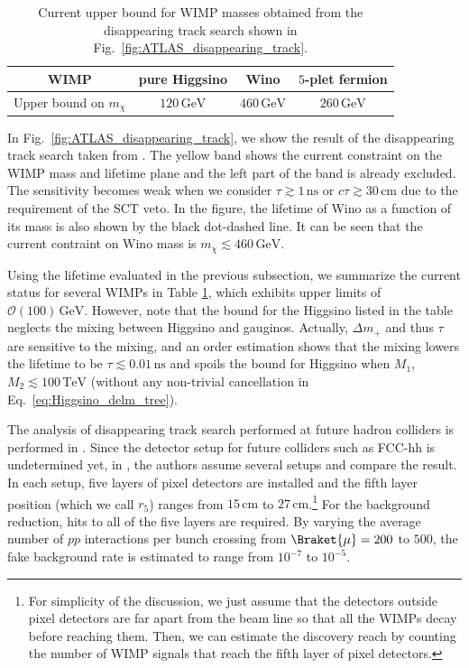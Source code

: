 \documentclass[12pt,twoside,book]{article}
\begin{document}
\begin{table}[t]
  \centering
  \begin{tabular}{c|ccc}
    WIMP & pure Higgsino & Wino & $5$-plet fermion \\ \hline
    Upper bound on $m_\chi$ & $120\, \mathrm{GeV}$ & $460\, \mathrm{GeV}$
    & $260\, \mathrm{GeV}$
  \end{tabular}
  \caption{
    Current upper bound for WIMP masses obtained from the disappearing track search shown in Fig.~\ref{fig:ATLAS_disappearing_track}.}
  \label{tab:disp_track_current}
\end{table}

In Fig.~\ref{fig:ATLAS_disappearing_track}, we show the result of the disappearing track search taken from \cite{Aaboud:2017mpt}.
The yellow band shows the current constraint on the WIMP mass and lifetime plane and the left part of the band is already excluded.
The sensitivity becomes weak when we consider $\tau \gtrsim 1\, \mathrm{ns}$ or $c \tau \gtrsim 30\, \mathrm{cm}$ due to the requirement of the SCT veto.
In the figure, the lifetime of Wino as a function of its mass is also shown by the black dot-dashed line.
It can be seen that the current contraint on Wino mass is $m_\chi \lesssim 460\,\mathrm{GeV}$.

Using the lifetime evaluated in the previous subsection, we summarize the current status for several WIMPs in Table \ref{tab:disp_track_current}, which exhibits upper limits of $\mathcal{O} (100)\,\mathrm{GeV}$.
However, note that the bound for the Higgsino listed in the table neglects the mixing between Higgsino and gauginos.
Actually, $\Delta m_{+}$ and thus $\tau$ are sensitive to the mixing, and an order estimation shows that the mixing lowers the lifetime to be $\tau \lesssim 0.01\,\mathrm{ns}$ and spoils the bound for Higgsino when $M_1$, $M_2 \lesssim 100\,\mathrm{TeV}$ (without any non-trivial cancellation in Eq.~\eqref{eq:Higgsino_delm_tree}).

The analysis of disappearing track search performed at future hadron colliders is performed in \cite{Han:2018wus, Saito:2019rtg}.
Since the detector setup for future colliders such as FCC-hh is undetermined yet, in \cite{Saito:2019rtg}, the authors assume several setups and compare the result.
In each setup, five layers of pixel detectors are installed and the fifth layer position (which we call $r_5$) ranges from $15\, \mathrm{cm}$ to $27\, \mathrm{cm}$.\footnote
{
  For simplicity of the discussion, we just assume that the detectors outside pixel detectors are far apart from the beam line so that all the WIMPs decay before reaching them.
  Then, we can estimate the discovery reach by counting the number of WIMP signals that reach the fifth layer of pixel detectors.
}
For the background reduction, hits to all of the five layers are required.
By varying the average number of $pp$ interactions per bunch crossing from $\Braket{\mu} = 200$ to $500$, the fake background rate is estimated to range from $10^{-7}$ to $10^{-5}$.
\end{document}

